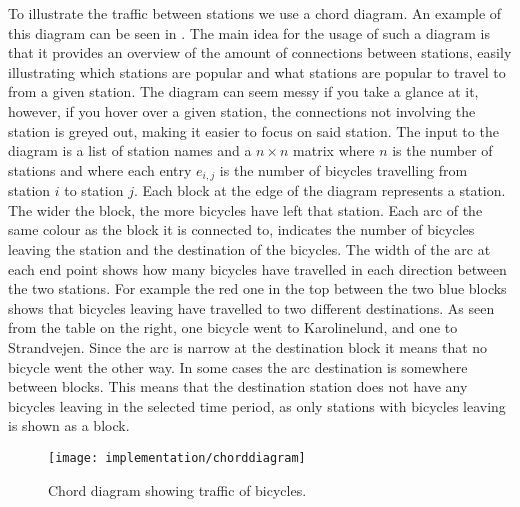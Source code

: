 To illustrate the traffic between stations we use a chord diagram. 
An example of this diagram can be seen in .
The main idea for the usage of such a diagram is that it provides an overview of the amount of connections between stations, easily illustrating which stations are popular and what stations are popular to travel to from a given station.
The diagram can seem messy if you take a glance at it, however, if you hover over a given station, the connections not involving the station is greyed out, making it easier to focus on said station.
The input to the diagram is a list of station names and a $n \times n$ matrix where $n$ is the number of stations and where each entry $e_{i,j}$ is the number of bicycles travelling from station $i$ to station $j$. 
Each block at the edge of the diagram represents a station. 
The wider the block, the more bicycles have left that station. 
Each arc of the same colour as the block it is connected to, indicates the number of bicycles leaving the station and the destination of the bicycles. 
The width of the arc at each end point shows how many bicycles have travelled in each direction between the two stations. 
For example the red one in the top between the two blue blocks shows that bicycles leaving have travelled to two different destinations. 
As seen from the table on the right, one bicycle went to Karolinelund, and one to Strandvejen. 
Since the arc is narrow at the destination block it means that no bicycle went the other way. 
In some cases the arc destination is somewhere between blocks. 
This means that the destination station does not have any bicycles leaving in the selected time period, as only stations with bicycles leaving is shown as a block.
\begin{figure}[h]
\texttt{[image: implementation/chorddiagram]}
\caption{Chord diagram showing traffic of bicycles.}\label{fig:chorddiagram}
\end{figure}

